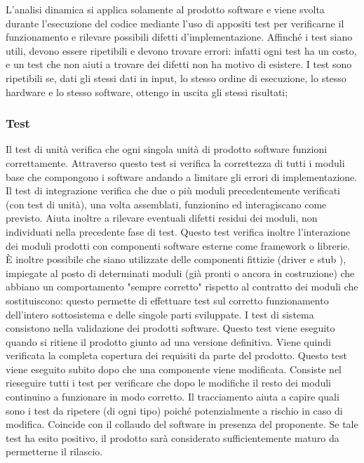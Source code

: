 \documentclass[a4paper,11pt]{article}
\begin{document}
				L'analisi dinamica si applica solamente al prodotto software e viene svolta durante l'esecuzione del codice mediante l'uso di appositi test per verificarne il funzionamento e rilevare possibili difetti d'implementazione. Affinché i test siano utili, devono essere ripetibili e devono trovare errori: infatti ogni test ha un costo, e un test che non aiuti a trovare dei difetti non ha motivo di esistere. I test sono ripetibili se, dati gli stessi dati in input, lo stesso ordine di esecuzione, lo stesso hardware e lo stesso software, ottengo in uscita gli stessi risultati;
				
				\subsubsection{Test}
								
				Il test di unità verifica che ogni singola unità di prodotto software funzioni correttamente.
Attraverso questo test si verifica la correttezza di tutti i moduli base che compongono i software andando
a limitare gli errori di implementazione.
				Il test di integrazione verifica che due o più moduli precedentemente verificati (con test di unità), una volta assemblati, funzionino ed interagiscano come previsto. Aiuta inoltre a rilevare eventuali difetti residui dei moduli, non individuati nella precedente fase di test. Questo test verifica inoltre l'interazione dei moduli prodotti con componenti software esterne come framework o librerie. È inoltre possibile che siano utilizzate delle componenti fittizie (driver e stub ), impiegate al posto di determinati moduli (già pronti o ancora in costruzione) che abbiano un comportamento "sempre corretto" rispetto al contratto dei moduli che sostituiscono: questo permette di effettuare test sul corretto funzionamento dell'intero sottosistema e delle singole parti sviluppate.
				I test di sistema consistono nella validazione dei prodotti software. Questo test viene eseguito quando si ritiene il prodotto giunto ad una versione definitiva. Viene quindi verificata la completa copertura dei requisiti da parte del prodotto.
				Questo test viene eseguito subito dopo che una componente viene modificata. Consiste nel rieseguire tutti i test per verificare che dopo le modifiche il resto dei moduli continuino a funzionare in modo corretto. Il tracciamento aiuta a capire quali sono i test da ripetere (di ogni tipo) poiché potenzialmente a rischio in caso di modifica.
				Coincide con il collaudo del software in presenza del proponente. Se tale test ha esito positivo, il prodotto sarà considerato sufficientemente maturo da permetterne il rilascio.
		\pagebreak
\end{document}
